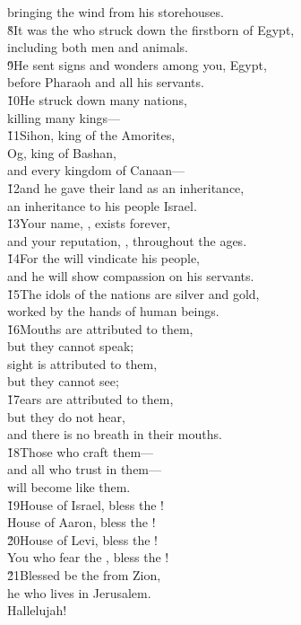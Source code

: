 \begin{poetry}
\poemlll       bringing the wind from his storehouses. \\
\poeml \v{8}It was the  who struck down the firstborn of Egypt, \\
\poemll    including both men and animals. \\
\poeml \v{9}He sent signs and wonders among you, Egypt, \\
\poemll    before Pharaoh and all his servants. \\
\poeml \v{10}He struck down many nations, \\
\poemll    killing many kings--- \\
\poeml \v{11}Sihon, king of the Amorites, \\
\poemll    Og, king of Bashan, \\
\poemlll       and every kingdom of Canaan--- \\
\poeml \v{12}and he gave their land as an inheritance, \\
\poemll    an inheritance to his people Israel. \\
\poeml \v{13}Your name, , exists forever, \\
\poemll    and your reputation, , throughout the ages. \\
\poeml \v{14}For the  will vindicate his people, \\
\poemll    and he will show compassion on his servants. \\
\poeml \v{15}The idols of the nations are silver and gold, \\
\poemll    worked by the hands of human beings. \\
\poeml \v{16}Mouths are attributed to them, \\
\poemll    but they cannot speak; \\
\poeml sight is attributed to them, \\
\poemll    but they cannot see; \\
\poeml \v{17}ears are attributed to them, \\
\poemll    but they do not hear, \\
\poemlll       and there is no breath in their mouths. \\
\poeml \v{18}Those who craft them--- \\
\poemll    and all who trust in them--- \\
\poemlll       will become like them. \\
\poeml \v{19}House of Israel, bless the ! \\
\poemll    House of Aaron, bless the ! \\
\poeml \v{20}House of Levi, bless the ! \\
\poemll    You who fear the , bless the ! \\
\poeml \v{21}Blessed be the  from Zion, \\
\poemll    he who lives in Jerusalem. \\
\poeml Hallelujah!
\end{poetry}
